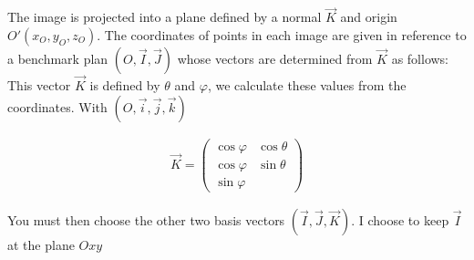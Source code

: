 \begin{minipage}{.45\textwidth}
The image is projected into a plane defined by a normal $\vec{K}$ and origin $O'(x_O,y_O,z_O)$. 
The coordinates of points in each image are given in reference to a benchmark plan 
$(O,\vec {I},\vec{J})$ whose vectors are determined from $\vec{K}$ as follows:
This vector $\vec{K}$ is defined by $\theta$ and $\varphi$, we calculate these values from the coordinates.
With $(O,\vec{i},\vec{j},\vec{k})$

\begin{align*}
 \vec{K}=\left(
 \begin{aligned}
 \cos\varphi & \cos\theta\\
 \cos\varphi & \sin\theta\\
 \sin\varphi
\end{aligned}%
\right)
\end{align*}

You must then choose the other two basis vectors
 $(\vec{I},\vec{J},\vec{K})$.
I choose to keep $\vec{I}$ at the plane $Oxy$
\end{minipage}
%
\hfill
%
